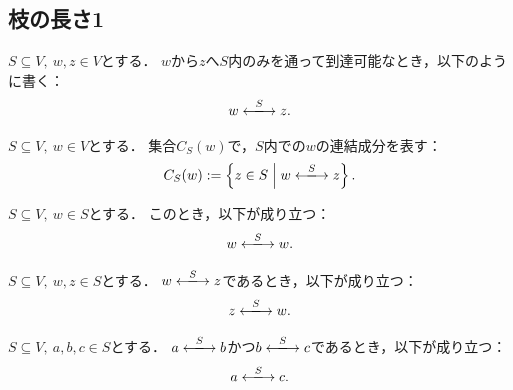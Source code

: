 \subsection{枝の長さ1}

\begin{definition}
  \label{def:reachIn}
  \leanok
  $S \subseteq V,\ w, z \in V$とする．
  $w$から$z$へ$S$内のみを通って到達可能なとき，以下のように書く：
  \begin{equation}
    w \reach{S} z.
  \end{equation}
\end{definition}

\begin{definition}
  \label{def:compIn}
  \leanok
  $S \subseteq V,\ w \in V$とする．
  集合$C_S(w)$で，$S$内での$w$の連結成分を表す：
  \begin{equation}
    C_S(w) := \set{z \in S}{w \reach{S} z}.
  \end{equation}
\end{definition}

\begin{lemma}
  \label{lem:reachIn_refl}
  \leanok
  \uses{}
  $S \subseteq V,\ w \in S$とする．
  このとき，以下が成り立つ：
  \begin{equation}
    w \reach{S} w.
  \end{equation}
\end{lemma}

\begin{lemma}
  \label{lem:reachIn_symm}
  \leanok
  \uses{}
  $S \subseteq V,\ w, z \in S$とする．
  $w \reach{S} z$であるとき，以下が成り立つ：
  \begin{equation}
    z \reach{S} w.
  \end{equation}
\end{lemma}

\begin{lemma}
  \label{lem:reachIn_trans}
  \leanok
  \uses{}
  $S \subseteq V,\ a, b, c \in S$とする．
  $a \reach{S} b$かつ$b \reach{S} c$であるとき，以下が成り立つ：
  \begin{equation}
    a \reach{S} c.
  \end{equation}
\end{lemma}

